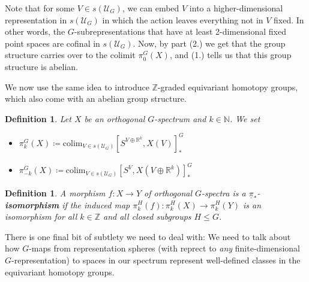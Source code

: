 \documentclass{scrartcl}
\newcommand{\textbi}[1]{\textbf{\textit{#1}}}
\newcommand{\bN}{\mathbb{N}}
\newcommand{\bZ}{\mathbb{Z}}
\newcommand{\bR}{\mathbb{R}}
\newcommand{\colim}{\mathrm{colim}}
\newtheorem{defin}[subsection]{Definition}
\begin{document}
Note that for some $V\in s(\mathcal{U}_G)$, we can embed $V$ into a higher-dimensional representation in $s(\mathcal{U}_G)$ in which the action leaves everything not in $V$ fixed. In other words, the $G$-subrepresentations that have at least 2-dimensional fixed point spaces are cofinal in $s(\mathcal{U}_G)$. Now, by part (2.) we get that the group structure carries over to the colimit $\pi^G_0(X)$, and (1.) tells us that this group structure is abelian. 

We now use the same idea to introduce $\bZ$-graded equivariant homotopy groups, which also come with an abelian group structure. 

\begin{defin}
    Let $X$ be an orthogonal $G$-spectrum and $k\in\bN$. We set
    \begin{itemize}
        \item $\pi^G_k(X)\coloneqq\colim_{V\in s(\mathcal{U}_G)}[S^{V\oplus \bR^k},X(V)]^G_*$
        \item $\pi^G_{-k}(X)\coloneqq\colim_{V\in s(\mathcal{U}_G)}[S^{V},X(V\oplus \bR^k)]^G_*$
    \end{itemize}
\end{defin}

\begin{defin}
    A morphism $f:X\to Y$ of orthogonal $G$-spectra is a $\underline{\pi}_*$-\textbi{isomorphism} if the induced map $\pi^H_k(f):\pi^H_k(X)\to\pi^H_k(Y)$ is an isomorphism for all $k\in\bZ$ and all closed subgroups $H\leq G$.
\end{defin}

There is one final bit of subtlety we need to deal with: We need to talk about how $G$-maps from representation spheres (with reprect to \textit{any} finite-dimensional $G$-representation) to spaces in our spectrum represent well-defined classes in the equivariant homotopy groups.
\end{document}
